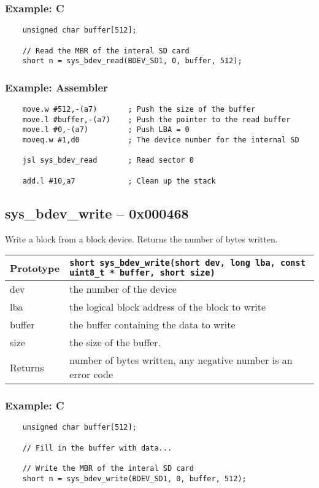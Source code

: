 \subsubsection*{Example: C}
\begin{lstlisting}
    unsigned char buffer[512];
    
    // Read the MBR of the interal SD card
    short n = sys_bdev_read(BDEV_SD1, 0, buffer, 512);
\end{lstlisting}

\subsubsection*{Example: Assembler}
\begin{verbatim}
    move.w #512,-(a7)   	; Push the size of the buffer
    move.l #buffer,-(a7)	; Push the pointer to the read buffer
    move.l #0,-(a7)     	; Push LBA = 0
    moveq.w #1,d0       	; The device number for the internal SD

    jsl sys_bdev_read   	; Read sector 0

    add.l #10,a7        	; Clean up the stack
\end{verbatim}

\subsection*{sys\_bdev\_write -- 0x000468}
Write a block from a block device. Returns the number of bytes written.

\bigskip

\begin{tabular}{|l||l|} \hline
Prototype & \lstinline!short sys_bdev_write(short dev, long lba, const uint8_t * buffer, short size)! \\ \hline
dev & the number of the device \\ \hline
lba & the logical block address of the block to write \\ \hline
buffer & the buffer containing the data to write \\ \hline
size & the size of the buffer. \\ \hline
Returns & number of bytes written, any negative number is an error code \\ \hline
\end{tabular}

\subsubsection*{Example: C}
\begin{lstlisting}
    unsigned char buffer[512];

    // Fill in the buffer with data...
    
    // Write the MBR of the interal SD card
    short n = sys_bdev_write(BDEV_SD1, 0, buffer, 512);
\end{lstlisting}

